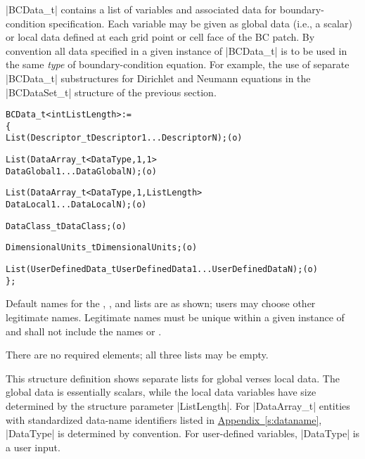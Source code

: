 |BCData_t| contains a list of variables and associated data for
boundary-condition specification.
Each variable may be given as global data (i.e., a scalar) or local data
defined at each grid point or cell face of the BC patch.
By convention all data specified in a given instance of |BCData_t| is to
be used in the same \emph{type} of boundary-condition equation.
For example, the use of separate |BCData_t| substructures for Dirichlet
and Neumann equations in the |BCDataSet_t| structure of the previous
section.

\begin{alltt}
  BCData\_t< int ListLength > :=
    \{
    List( Descriptor\_t  Descriptor1 ... DescriptorN ) ;                     (o)

    List( DataArray\_t<DataType, 1, 1>     
          DataGlobal1 ... DataGlobalN ) ;                                   (o)

    List( DataArray\_t<DataType, 1, ListLength>       
          DataLocal1 ... DataLocalN ) ;                                     (o)

    DataClass\_t DataClass ;                                                 (o)
                
    DimensionalUnits\_t DimensionalUnits ;                                   (o)

    List( UserDefinedData\_t UserDefinedData1 ... UserDefinedDataN ) ;       (o)
    \} ;
\end{alltt}

\begin{notes}
\item
 Default names for the , , and
 lists are as shown; users may choose other legitimate names.
 Legitimate names must be unique within a given instance of
  and shall not include the names  or
 .
\item
 There are no required elements; all three lists may be empty.
\end{notes}

This structure definition shows separate lists for global verses local
data.  The global data is essentially scalars, while the local data
variables have size determined by the structure parameter |ListLength|.
For |DataArray_t| entities with standardized data-name identifiers
listed in \hyperref[s:dataname]{Appendix~\ref*{s:dataname}}, |DataType|
is determined by convention.
For user-defined variables, |DataType| is a user input.

